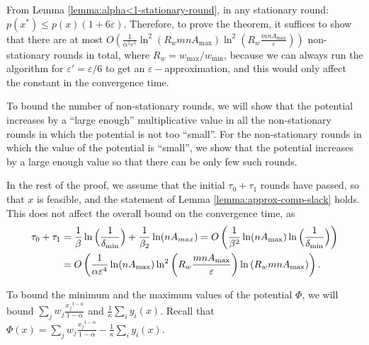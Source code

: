 \documentclass[11pt]{article}
\makeatletter
\newcommand{\wratio}{R_w}
\newenvironment{proofof}[1]{\par
  \pushQED{\qed}\normalfont \topsep3\p@\relax
  \trivlist
  \item[\hskip\labelsep
        \bfseries
    Proof of #1\@addpunct{.}]\ignorespaces
}{\popQED\endtrivlist\@endpefalse
}
\makeatother
\begin{document}
\begin{proofof}{Theorem \ref{thm:convergence-alpha<1}}
From Lemma \ref{lemma:alpha<1-stationary-round}, in any stationary round: $p(x^*) \leq p(x) (1 + 6\varepsilon)$. Therefore, to prove the theorem, it suffices to show that there are at most $O\left(\frac{1}{\alpha^2\varepsilon^5}\ln^2\left(\wratio{mnA_{\max}}\right)\ln^2\left(\wratio\frac{mnA_{\max}}{\varepsilon}\right)\right)$ non-stationary rounds in total, where $\wratio = {w_{\max}}/{ w_{\min}}$, because we can always run the algorithm for $\varepsilon' = \varepsilon/6$ to get an $\varepsilon-$approximation, and this would only affect the constant in the convergence time. 

To bound the number of non-stationary rounds, we will show that the potential increases by a ``large enough'' multiplicative value in all the non-stationary rounds in which the potential is not too ``small''. For the non-stationary rounds in which the value of the potential is ``small'', we show that the potential increases by a large enough value so that there can be only few such rounds. 

In the rest of the proof, we assume that the initial $\tau_0 + \tau_1 $ rounds have passed, so that $x$ is feasible, and the statement of Lemma \ref{lemma:approx-comp-slack} holds. This does not affect the overall bound on the convergence time, as 
\begin{align}
\tau_0 + \tau_1 &= \frac{1}{\beta}\ln\Big(\frac{1}{\delta_{\min}}\Big) + \frac{1}{\beta_2}\ln(nA_{max}) = O\left( \frac{1}{\beta^2}\ln(nA_{\max})\ln\Big(\frac{1}{\delta_{\min}}\Big)\right)\notag\\
&= O\left(\frac{1}{\alpha\varepsilon^4}\ln(nA_{\max})\ln^2\left(\wratio\frac{mnA_{\max}}{\varepsilon}\right)\ln\left(\wratio mnA_{\max}\right)\right).\label{eq:tau1+tau0-bound}
\end{align}

To bound the minimum and the maximum values of the potential $\Phi$, we will bound $\sum_j w_j \frac{{x_j}^{1-\alpha}}{1-\alpha}$ and $\frac{1}{\kappa}\sum_i y_i(x)$. Recall that $\Phi(x) = \sum_j w_j \frac{{x_j}^{1-\alpha}}{1-\alpha} - \frac{1}{\kappa}\sum_i y_i(x)$. 


\end{proofof}
\end{document}
